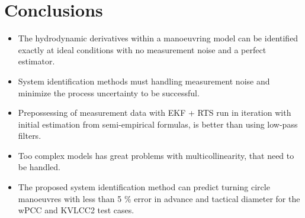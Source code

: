 \chapter{Conclusions\label{ch:conclusions}}

\begin{itemize}
    
    \item The hydrodynamic derivatives within a manoeuvring model can be identified exactly at ideal conditions with no measurement noise and a perfect estimator.
    
    \item System identification methods must handling measurement noise and minimize the process uncertainty to be successful.
    
    \item Prepossessing of measurement data with EKF + RTS run in iteration with initial estimation from semi-empirical formulas, is better than using low-pass filters.
    
    \item Too complex models has great problems with multicollinearity, that need to be handled.
    
    \item The proposed system identification method can predict turning circle manoeuvres with less than 5 \% error in advance and tactical diameter for the wPCC and KVLCC2 test cases.
    
\end{itemize}
